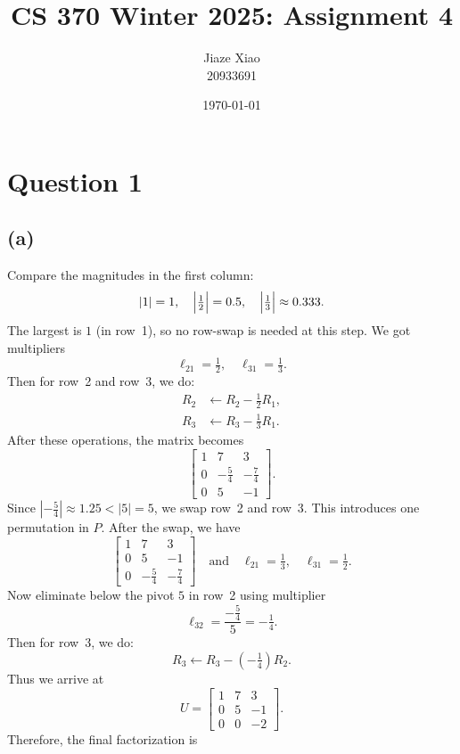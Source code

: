 \documentclass{article}
\title{\textbf{CS 370 Winter 2025: Assignment 4}}
\author{Jiaze Xiao \\ 20933691}
\date{\today}
\begin{document}
\maketitle

\section*{Question 1}
\subsection*{(a)}
Compare the magnitudes in the first column:
$$
    |1| = 1, \quad \Bigl|\tfrac12\Bigr| = 0.5, \quad \Bigl|\tfrac13\Bigr| \approx 0.333.
$$
The largest is $1$ (in row~1), so no row-swap is needed at this step. We got multipliers
$$
    \ell_{21} = \tfrac12,
    \quad
    \ell_{31} = \tfrac13.
$$
Then for row~2 and row~3, we do:
$$
    \begin{aligned}
        R_2 & \leftarrow R_2 - \tfrac12R_1, \\
        R_3 & \leftarrow R_3 - \tfrac13R_1.
    \end{aligned}
$$
After these operations, the matrix becomes
$$
    \begin{bmatrix}
        1 & 7         & 3         \\
        0 & -\tfrac54 & -\tfrac74 \\
        0 & 5         & -1
    \end{bmatrix}.
$$
Since $|-\tfrac54| \approx 1.25 < |5| = 5$, we swap row~2 and row~3. This introduces one permutation in $P$. After the swap, we have
$$
    \begin{bmatrix}
        1 & 7         & 3         \\
        0 & 5         & -1        \\
        0 & -\tfrac54 & -\tfrac74
    \end{bmatrix}\quad
    \text{and}\quad
    \ell_{21} = \tfrac13,
    \quad
    \ell_{31} = \tfrac12.
$$
Now eliminate below the pivot $5$ in row~2 using multiplier
$$
    \ell_{32} = \frac{-\tfrac54}{5} = -\tfrac14.
$$
Then for row~3, we do:
$$
    R_3 \leftarrow R_3 -(-\tfrac14)R_2.
$$
Thus we arrive at
$$
    U =
    \begin{bmatrix}
        1 & 7 & 3  \\
        0 & 5 & -1 \\
        0 & 0 & -2
    \end{bmatrix}.
$$
Therefore, the final factorization is
\end{document}
